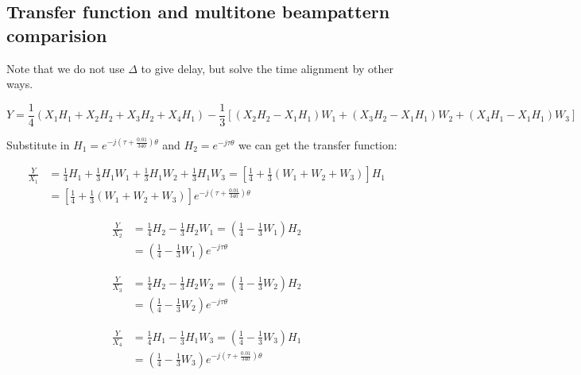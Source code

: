 \documentclass[onecolumn, conference]{IEEEtran}
\begin{document}
\subsection{Transfer function and multitone	beampattern comparision}
Note that we do not use $\Delta$ to give delay, but solve the time alignment by other ways.

\begin{equation}
Y= \frac{1}{4}(X_1H_1+X_2H_2+X_3H_2+X_4H_1)-\frac{1}{3}[(X_2H_2-X_1H_1)W_1+(X_3H_2-X_1H_1)W_2+(X_4H_1-X_1H_1)W_3] 
\label{eq}
\end{equation}

Substitute in \(H_1=e^{-j(\tau+\frac{0.01}{340})\theta} \) and \(H_2=e^{-j\tau\theta}\) we can get the transfer function:

\begin{equation}
\begin{aligned}
\frac{Y}{X_1}&=\frac{1}{4}H_1+\frac{1}{3}H_1W_1+\frac{1}{3}H_1W_2+\frac{1}{3}H_1W_3 
=[\frac{1}{4}+\frac{1}{3}(W_1+W_2+W_3)]H_1 \\   &= [\frac{1}{4}+\frac{1}{3}(W_1+W_2+W_3)]e^{-j(\tau+\frac{0.01}{340})\theta}
\end{aligned}
\label{eq}
\end{equation}

\begin{equation}
\begin{aligned}
\frac{Y}{X_2}&=\frac{1}{4}H_2-\frac{1}{3}H_2W_1
=(\frac{1}{4}-\frac{1}{3}W_1)H_2 \\   &= (\frac{1}{4}-\frac{1}{3}W_1)e^{-j\tau\theta}
\end{aligned}
\label{eq}
\end{equation}

\begin{equation}
\begin{aligned}
\frac{Y}{X_3}&=\frac{1}{4}H_2-\frac{1}{3}H_2W_2
=(\frac{1}{4}-\frac{1}{3}W_2)H_2 \\   &= (\frac{1}{4}-\frac{1}{3}W_2)e^{-j\tau\theta}
\end{aligned}
\label{eq}
\end{equation}

\begin{equation}
\begin{aligned}
\frac{Y}{X_4}&=\frac{1}{4}H_1-\frac{1}{3}H_1W_3
=(\frac{1}{4}-\frac{1}{3}W_3)H_1 \\   &= (\frac{1}{4}-\frac{1}{3}W_3)e^{-j(\tau+\frac{0.01}{340})\theta}
\end{aligned}
\label{eq}
\end{equation}
\end{document}
